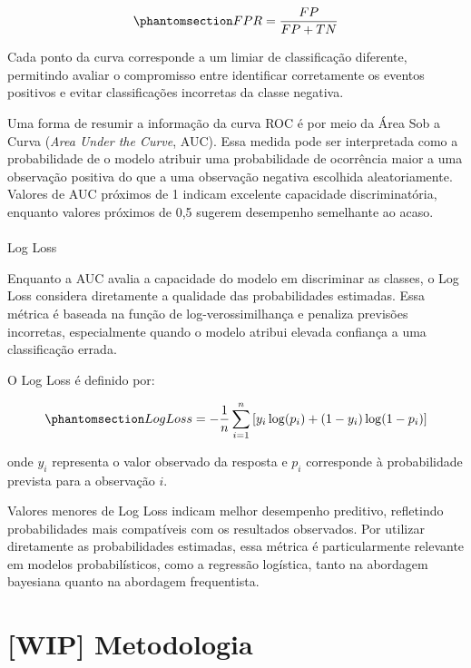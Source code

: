\documentclass[
  brazilian,
  12pt,
  letterpaper,
  DIV=11,
  numbers=noendperiod]{scrartcl}
\makeatletter
\let\oldparagraph\paragraph
\renewcommand{\paragraph}{
    \@ifstar
      \xxxParagraphStar
      \xxxParagraphNoStar
  }
\newcommand{\xxxParagraphStar}[1]{\oldparagraph*{#1}\mbox{}}
\newcommand{\xxxParagraphNoStar}[1]{\oldparagraph{#1}\mbox{}}
\makeatother
\begin{document}
\begin{equation}\protect\phantomsection\label{eq-fpr}{
FPR=
\frac{FP}
{FP+TN}
}\end{equation}

Cada ponto da curva corresponde a um limiar de classificação diferente,
permitindo avaliar o compromisso entre identificar corretamente os
eventos positivos e evitar classificações incorretas da classe negativa.

Uma forma de resumir a informação da curva ROC é por meio da Área Sob a
Curva (\emph{Area Under the Curve}, AUC). Essa medida pode ser
interpretada como a probabilidade de o modelo atribuir uma probabilidade
de ocorrência maior a uma observação positiva do que a uma observação
negativa escolhida aleatoriamente. Valores de AUC próximos de 1 indicam
excelente capacidade discriminatória, enquanto valores próximos de 0,5
sugerem desempenho semelhante ao acaso.

\paragraph{Log Loss}\label{log-loss}

Enquanto a AUC avalia a capacidade do modelo em discriminar as classes,
o Log Loss considera diretamente a qualidade das probabilidades
estimadas. Essa métrica é baseada na função de log-verossimilhança e
penaliza previsões incorretas, especialmente quando o modelo atribui
elevada confiança a uma classificação errada.

O Log Loss é definido por:

\begin{equation}\protect\phantomsection\label{eq-logloss}{
LogLoss=
-\frac{1}{n}
\sum_{i=1}^{n}
\left[
y_i\log(p_i)
+
(1-y_i)\log(1-p_i)
\right]
}\end{equation}

onde \(y_i\) representa o valor observado da resposta e \(p_i\)
corresponde à probabilidade prevista para a observação \(i\).

Valores menores de Log Loss indicam melhor desempenho preditivo,
refletindo probabilidades mais compatíveis com os resultados observados.
Por utilizar diretamente as probabilidades estimadas, essa métrica é
particularmente relevante em modelos probabilísticos, como a regressão
logística, tanto na abordagem bayesiana quanto na abordagem
frequentista.

\section{{[}WIP{]} Metodologia}\label{wip-metodologia}
\end{document}
